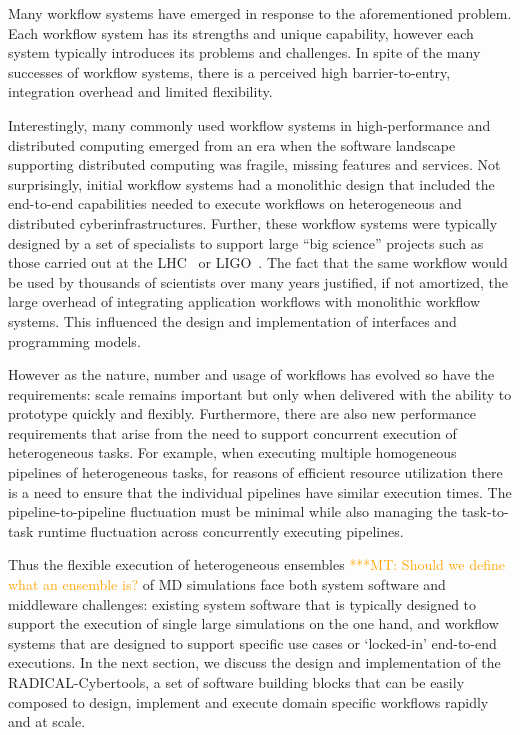 \documentclass[conference]{IEEEtran}
\newcommand{\mtnote}[1]{ {\textcolor{orange} { ***MT: #1 }}}
\newcommand{\mtnote}[1]{}
\begin{document}
Many workflow systems have emerged in response to the aforementioned problem.
Each workflow system has its strengths and unique capability, however each
system typically introduces its problems and challenges. In spite of the many
successes of workflow systems, there is a perceived high barrier-to-entry,
integration overhead and limited flexibility.

Interestingly, many commonly used workflow systems in high-performance and
distributed computing emerged from an era when the software landscape
supporting distributed computing was fragile, missing features and services.
Not surprisingly, initial workflow systems had a monolithic design that
included the end-to-end capabilities needed to execute workflows on
heterogeneous and distributed cyberinfrastructures. Further, these workflow
systems were typically designed by a set of specialists to support large
``big science'' projects such as those carried out at the
LHC~\cite{breskin2009cern} or LIGO~\cite{althouse1992ligo}. The fact that the
same workflow would be used by thousands of scientists over many years
justified, if not amortized, the large overhead of integrating application
workflows with monolithic workflow systems. This influenced the design and
implementation of %
interfaces and programming models.

However as the nature, number and usage of workflows has evolved so have the
requirements: scale remains important but only when delivered with the
ability to prototype quickly and flexibly. Furthermore, there are also new
performance requirements that arise from the need to support concurrent
execution of heterogeneous tasks. For example, when executing multiple
homogeneous pipelines of heterogeneous tasks, for reasons of efficient
resource utilization there is a need to ensure that the individual pipelines
have similar execution times. The pipeline-to-pipeline fluctuation must be
minimal while also managing the task-to-task runtime fluctuation across
concurrently executing pipelines.

Thus the flexible execution of heterogeneous ensembles\mtnote{Should we
define what an ensemble is?} of MD simulations face both system software and
middleware challenges: existing system software that is typically designed to
support the execution of single large simulations on the one hand, and
workflow systems that are designed to support specific use cases or
`locked-in' end-to-end executions. %
In the next section, we discuss the design and implementation of the
RADICAL-Cybertools, a set of software building blocks that can be easily
composed to design, implement and execute domain specific workflows rapidly
and at scale.
\end{document}
